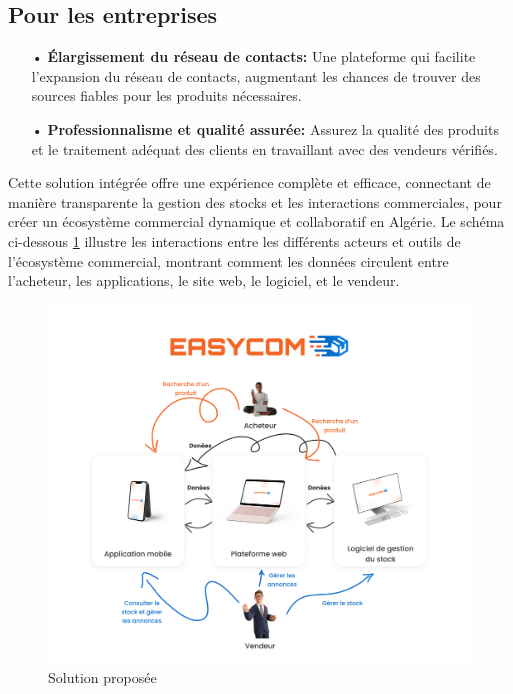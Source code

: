 \documentclass[edit,12pt,a4paper,ChapStyle,oneside,doubleinterligne]{report}
\begin{document}
\subsection{Pour les entreprises}
\begin{itemize}
    \item [•] \textbf{Élargissement du réseau de contacts: }Une plateforme qui facilite l'expansion du réseau de contacts, augmentant les chances de trouver des sources fiables pour les produits nécessaires.
    \item [•] \textbf{Professionnalisme et qualité assurée: }Assurez la qualité des produits et le traitement adéquat des clients en travaillant avec des vendeurs vérifiés.
\end{itemize}
\phantom{hassane}
\newline
Cette solution intégrée offre une expérience complète et efficace, connectant de manière transparente la gestion des stocks et les interactions commerciales, pour créer un écosystème commercial dynamique et collaboratif en Algérie.
\newline \newline Le schéma ci-dessous \ref{fig:figure1.3} illustre les interactions entre les différents acteurs et outils de l'écosystème commercial, montrant comment les données circulent entre l'acheteur, les applications, le site web, le logiciel, et le vendeur.
\begin{figure}[h!]
    \centering
    \includegraphics[width=1\textwidth]{images/photo_2024-06-05_16-41-28.jpg}
    \caption{Solution proposée}
    \label{fig:figure1.3}
\end{figure}
\end{document}

